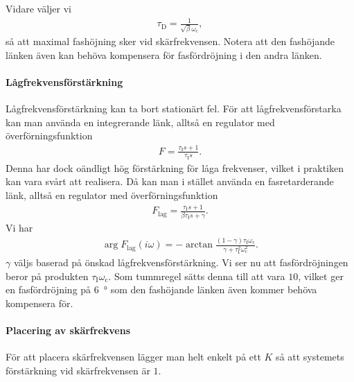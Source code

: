 Vidare väljer vi
\begin{align*}
	\tau_{\text{D}} = \frac{1}{\sqrt{\beta}\omega_{\text{c}}},
\end{align*}
så att maximal fashöjning sker vid skärfrekvensen. Notera att den fashöjande länken även kan behöva kompensera för fasfördröjning i den andra länken.

\paragraph{Lågfrekvensförstärkning}
Lågfrekvensförstärkning kan ta bort stationärt fel. För att lågfrekvensförstarka kan man använda en integrerande länk, alltså en regulator med överförningsfunktion
\begin{align*}
	F = \frac{\tau_{\text{I}}s + 1}{\tau_{\text{I}}s}.
\end{align*}
Denna har dock oändligt hög förstärkning för låga frekvenser, vilket i praktiken kan vara svårt att realisera. Då kan man i stället använda en fasretarderande länk, alltså en regulator med överförningsfunktion
\begin{align*}
	F_{\text{lag}} = \frac{\tau_{\text{I}}s + 1}{\beta\tau_{\text{I}}s + \gamma}.
\end{align*}
Vi har
\begin{align*}
	\arg{F_{\text{lag}}(i\omega)} = -\arctan{\frac{(1 - \gamma)\tau_{\text{I}}\omega_{\text{c}}}{\gamma + \tau_{\text{I}}^{2}\omega_{\text{c}}^{2}}}.
\end{align*}
$\gamma$ väljs baserad på önskad lågfrekvensförstärkning. Vi ser nu att fasfördröjningen beror på produkten $\tau_{\text{I}}\omega_{\text{c}}$. Som tummregel sätts denna till att vara $10$, vilket ger en fasfördröjning på \SI{6}{\degree} som den fashöjande länken även kommer behöva kompensera för.

\paragraph{Placering av skärfrekvens}
För att placera skärfrekvensen lägger man helt enkelt på ett $K$ så att systemets förstärkning vid skärfrekvensen är $1$.

